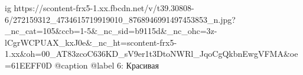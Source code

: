  
 
 
 
 

\ifcmt
  ig https://scontent-frx5-1.xx.fbcdn.net/v/t39.30808-6/272159312_4734615719919010_8768946991497453853_n.jpg?_nc_cat=105&ccb=1-5&_nc_sid=b9115d&_nc_ohc=3z-lCgrWCPUAX_kxJ0e&_nc_ht=scontent-frx5-1.xx&oh=00_AT83zcoC636KD_sV9er1t3DtoNWRl_JqoCgQkbnEwgVFMA&oe=61EEFF0D
  @caption @label 6: Красивая
\fi
